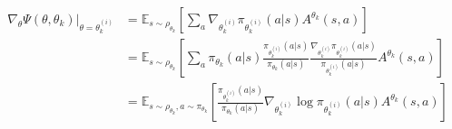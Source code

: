 \begin{align*}
    \nabla_{\theta} \Psi(\theta, \theta_k)|_{\theta = \theta_k^{(i)}}
        &= \mathbb{E}_{s \sim \rho_{\theta_k}} [\sum_a \nabla_{\theta_k^{(i)}} \pi_{\theta_k^{(i)}}(a|s) A^{\theta_k}(s, a)] \\
        &= \mathbb{E}_{s \sim \rho_{\theta_k}} [\sum_a \pi_{\theta_k}(a|s) \frac{\pi_{\theta_k^{(i)}}(a|s)}{\pi_{\theta_k}(a|s)} \frac{\nabla_{\theta_k^{(i)}} \pi_{\theta_k^{(i)}}(a | s)}{\pi_{\theta_k^{(i)}}(a|s)} A^{\theta_k}(s, a)] \\
        &= \mathbb{E}_{s \sim \rho_{\theta_k}, a \sim \pi_{\theta_k}} [\frac{\pi_{\theta_k^{(i)}}(a|s)}{\pi_{\theta_k}(a|s)} \nabla_{\theta_k^{(i)}} \log \pi_{\theta_k^{(i)}}(a | s) A^{\theta_k}(s, a)]
\end{align*}

































































